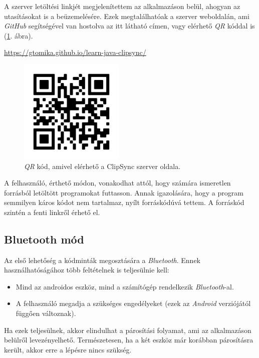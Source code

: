 \documentclass[12pt,a4paper]{article}
\begin{document}
	A szerver letöltési linkjét megjelenítettem az alkalmazáson belül, ahogyan az utasításokat is a beüzemelésére. Ezek megtalálhatóak a szerver weboldalán, ami \textit{GitHub} segítségével van hostolva az itt látható címen, vagy elérhető \textit{QR} kóddal is (\ref{qr_clipsync}. ábra).
	
	\begin{center}
		\url{https://gtomika.github.io/learn-java-clipsync/}
	\end{center}

	\begin{figure}[h!]
		\centering
		\includegraphics[width=5cm]{clipsync_server_qr}
		\caption{\textit{QR} kód, amivel elérhető a ClipSync szerver oldala.}
		\label{qr_clipsync}
	\end{figure}

	A felhasználó, érthető módon, vonakodhat attól, hogy számára ismeretlen forrásból letöltött programokat futtasson. Annak igazolására, hogy a program semmilyen káros kódot nem tartalmaz, nyílt forráskódúvá tettem. A forráskód szintén a fenti linkről érhető el.
	
	\subsection{Bluetooth mód}
	
	Az első lehetőség a kódminták megosztására a \textit{Bluetooth}. Ennek használhatóságához több feltételnek is teljesülnie kell:
	
	\begin{itemize}
		\item Mind az androidos eszköz, mind a számítógép rendelkezik \textit{Bluetooth}-al.
		\item A felhasználó megadja a szükséges engedélyeket (ezek az \textit{Android} verziójától függően változnak).
	\end{itemize}

	Ha ezek teljesülnek, akkor elindulhat a párosítási folyamat, ami az alkalmazáson belülről levezényelhető. Természetesen, ha a két eszköz már korábban párosításra 
	került, akkor erre a lépésre nincs szükség.
	
\end{document}
